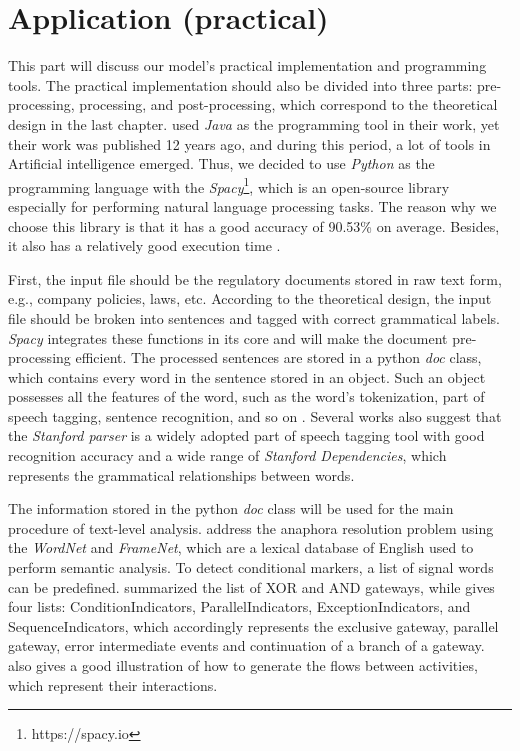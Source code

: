\chapter{Application (practical)}
This part will discuss our model's practical implementation and programming tools. The practical implementation should also be divided into three parts: pre-processing, processing, and post-processing, which correspond to the theoretical design in the last chapter. \cite{t2m_1} used \textit{Java} as the programming tool in their work, yet their work was published 12 years ago, and during this period, a lot of tools in Artificial intelligence emerged. Thus, we decided to use \textit{Python} as the programming language with the \textit{Spacy}\footnote{https://spacy.io}, which is an open-source library especially for performing natural language processing tasks. The reason why we choose this library is that it has a good accuracy of 90.53\% on average. Besides, it also has a relatively good execution time \cite{complement_1}.

First, the input file should be the regulatory documents stored in raw text form, e.g., company policies, laws, etc. According to the theoretical design, the input file should be broken into sentences and tagged with correct grammatical labels. \textit{Spacy} integrates these functions in its core and will make the document pre-processing efficient. The processed sentences are stored in a python \textit{doc} class, which contains every word in the sentence stored in an object. Such an object possesses all the features of the word, such as the word's tokenization, part of speech tagging, sentence recognition, and so on \cite{complement_1}. Several works \cite{t2m_1} \cite{t2m_2} \cite{t2m_4} also suggest that the \textit{Stanford parser} is a widely adopted part of speech tagging tool with good recognition accuracy and a wide range of \textit{Stanford Dependencies}, which represents the grammatical relationships between words. 

The information stored in the python \textit{doc} class will be used for the main procedure of text-level analysis. \cite{literature_review_4} \cite{t2m_1} address the anaphora resolution problem using the \textit{WordNet} and \textit{FrameNet}, which are a lexical database of English used to perform semantic analysis. To detect conditional markers, a list of signal words can be predefined. \cite{complement_1} summarized the list of XOR and AND gateways, while \cite{t2m_1} gives four lists: ConditionIndicators, ParallelIndicators, ExceptionIndicators, and SequenceIndicators, which accordingly represents the exclusive gateway, parallel gateway, error intermediate events and continuation of a branch of a gateway. \cite{t2m_1} also gives a good illustration of how to generate the flows between activities, which represent their interactions. 

